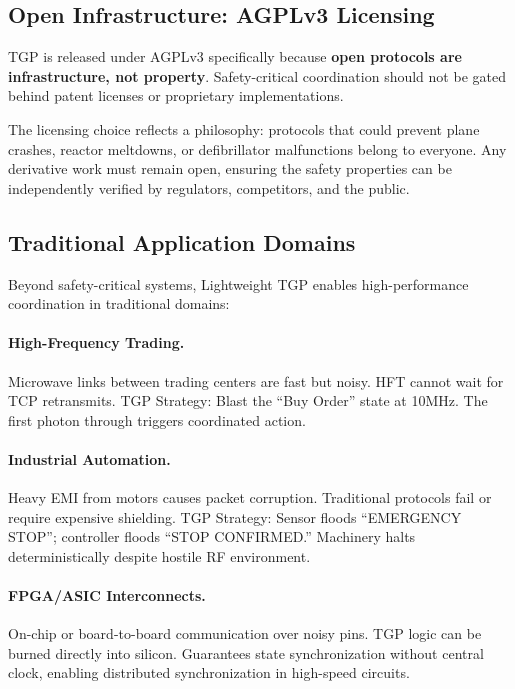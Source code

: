 \subsection{Open Infrastructure: AGPLv3 Licensing}

TGP is released under AGPLv3 specifically because \textbf{open protocols are infrastructure, not property}. Safety-critical coordination should not be gated behind patent licenses or proprietary implementations.

The licensing choice reflects a philosophy: protocols that could prevent plane crashes, reactor meltdowns, or defibrillator malfunctions belong to everyone. Any derivative work must remain open, ensuring the safety properties can be independently verified by regulators, competitors, and the public.

\subsection{Traditional Application Domains}

Beyond safety-critical systems, Lightweight TGP enables high-performance coordination in traditional domains:

\paragraph{High-Frequency Trading.}
Microwave links between trading centers are fast but noisy. HFT cannot wait for TCP retransmits. TGP Strategy: Blast the ``Buy Order'' state at 10MHz. The first photon through triggers coordinated action.

\paragraph{Industrial Automation.}
Heavy EMI from motors causes packet corruption. Traditional protocols fail or require expensive shielding. TGP Strategy: Sensor floods ``EMERGENCY STOP''; controller floods ``STOP CONFIRMED.'' Machinery halts deterministically despite hostile RF environment.

\paragraph{FPGA/ASIC Interconnects.}
On-chip or board-to-board communication over noisy pins. TGP logic can be burned directly into silicon. Guarantees state synchronization without central clock, enabling distributed synchronization in high-speed circuits.

